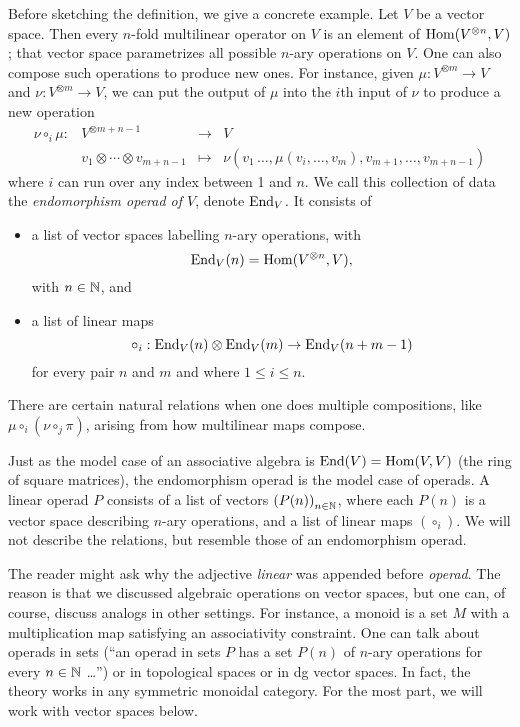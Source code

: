 \documentclass[11pt]{amsart}
\begin{document}
Before sketching the definition, we give a concrete example.
Let $V$ be a vector space.
Then every $n$-fold multilinear operator on $V$ is an element of ${\rm Hom}(V^{\otimes n}, V)$;
that vector space parametrizes all possible $n$-ary operations on $V$.
One can also compose such operations to produce new ones.
For instance, given $\mu : V^{\otimes m} \to V$ and $\nu: V^{\otimes m} \to V$, we can put the output of $\mu$ into the $i$th input of $\nu$ to produce a new operation
\[
\begin{array}{cccc}
\nu \circ_i \mu: & V^{\otimes m+n-1} & \to & V\\
& v_1 \otimes \cdots \otimes v_{m+n-1} & \mapsto & \nu(v_1 \, \ldots, \mu(v_i, \ldots, v_m), v_{m+1}, \ldots, v_{m+n-1})
\end{array}
\]
where $i$ can run over any index between 1 and $n$.
We call this collection of data the {\em endomorphism operad of $V$}, denote ${\rm End}_V$.
It consists of 
\begin{itemize}
\item a list of vector spaces labelling $n$-ary operations, with 
\[
{\rm End}_V(n)= {\rm Hom}(V^{\otimes n}, V),
\]
with $n \in \mathbb N$, and
\item a list of linear maps
\[
\circ_i : {\rm End}_V(n) \otimes {\rm End}_V(m) \to {\rm End}_V(n+m-1)
\]
for every pair $n$ and $m$ and where $1 \leq i \leq n$.
\end{itemize}
There are certain natural relations when one does multiple compositions, like $\mu \circ_i (\nu \circ_j \pi)$, arising from how multilinear maps compose.

Just as the model case of an associative algebra is ${\rm End}(V) = {\rm Hom}(V,V)$ (the ring of square matrices),
the endomorphism operad is the model case of operads.
A linear operad $P$ consists of a list of vectors $\left(P(n) \right)_{n \in \mathbb N}$, where each $P(n)$ is a vector space describing $n$-ary operations, and a list of linear maps $\left(\circ_i\right)$.
We will not describe the relations, but resemble those of an endomorphism operad.

\begin{rmk}
The reader might ask why the adjective {\em linear} was appended before {\em operad}.
The reason is that we discussed algebraic operations on vector spaces,
but one can, of course, discuss analogs in other settings.
For instance, a monoid is a set $M$ with a multiplication map satisfying an associativity constraint.
One can talk about operads in sets (``an operad in sets $P$ has a set $P(n)$ of $n$-ary operations for every $n \in \mathbb N$ \dots'') or in topological spaces or in dg vector spaces.
In fact, the theory works in any symmetric monoidal category. 
For the most part, we will work with vector spaces below.
\end{rmk}
\end{document}
